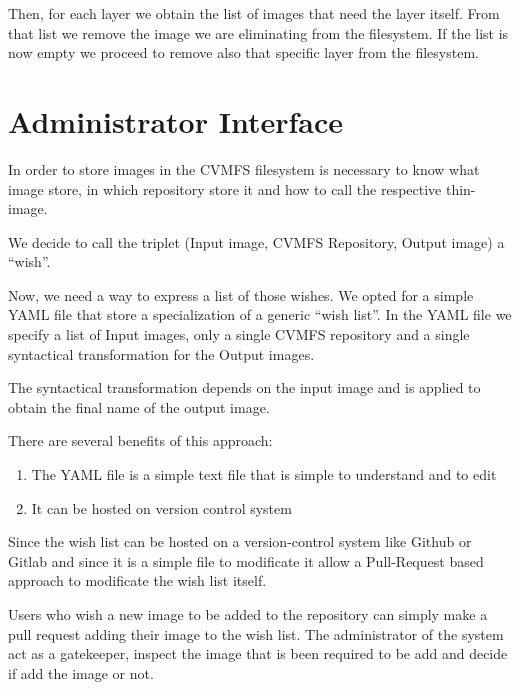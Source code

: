 Then, for each layer we obtain the list of images that need the layer itself.
From that list we remove the image we are eliminating from the filesystem. If
the list is now empty we proceed to remove also that specific layer from the
filesystem.

\section{Administrator Interface}

In order to store images in the CVMFS filesystem is necessary to know what
image store, in which repository store it and how to call the respective
thin-image.

We decide to call the triplet (Input image, CVMFS Repository, Output image) a
“wish”.

Now, we need a way to express a list of those wishes. We opted for a simple
YAML file that store a specialization of a generic “wish list”. In the YAML
file we specify a list of Input images, only a single CVMFS repository and a
single syntactical transformation for the Output images.

The syntactical transformation depends on the input image and is applied to
obtain the final name of the output image.

There are several benefits of this approach: 
\begin{enumerate} 
\item The YAML file is a simple text file that is simple to understand and to
        edit 
\item It can be hosted on version control system 
\end{enumerate}

Since the wish list can be hosted on a version-control system like Github or
Gitlab and since it is a simple file to modificate it allow a Pull-Request
based approach to modificate the wish list itself.

Users who wish a new image to be added to the repository can simply make a pull
request adding their image to the wish list. The administrator of the system
act as a gatekeeper, inspect the image that is been required to be add and
decide if add the image or not.

